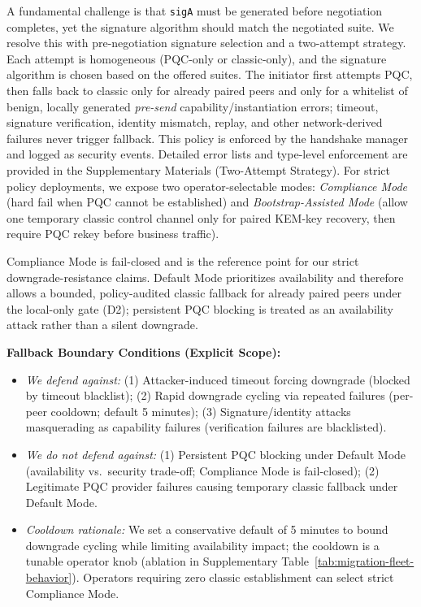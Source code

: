 \documentclass[10pt,journal,compsoc]{IEEEtran}
\providecommand{\tightlist}{%
  \setlength{\itemsep}{0pt}\setlength{\parskip}{0pt}}
\begin{document}
A fundamental challenge is that \texttt{sigA} must be generated before
negotiation completes, yet the signature algorithm should match the
negotiated suite. We resolve this with pre-negotiation signature
selection and a two-attempt strategy. Each attempt is homogeneous
(PQC-only or classic-only), and the signature algorithm is chosen based
on the offered suites. The initiator first attempts PQC, then falls back
to classic only for already paired peers and only for a whitelist of
benign, locally generated \emph{pre-send} capability/instantiation
errors; timeout, signature
verification, identity mismatch, replay, and other network-derived
failures never trigger fallback. This policy is enforced by the
handshake manager and logged as security events. Detailed error lists
and type-level enforcement are provided in the Supplementary Materials
(Two-Attempt Strategy).
For strict policy deployments, we expose two operator-selectable modes:
\emph{Compliance Mode} (hard fail when PQC cannot be established) and
\emph{Bootstrap-Assisted Mode} (allow one temporary classic control
channel only for paired KEM-key recovery, then require PQC rekey before
business traffic).

Compliance Mode is fail-closed and is the reference point for our strict
downgrade-resistance claims. Default Mode prioritizes availability and
therefore allows a bounded, policy-audited classic fallback for already
paired peers under the local-only gate (D2); persistent PQC blocking is
treated as an availability attack rather than a silent downgrade.

\textbf{Fallback Boundary Conditions (Explicit Scope):}
\begin{itemize}\tightlist
\item \emph{We defend against:} (1) Attacker-induced timeout forcing downgrade (blocked by timeout blacklist); (2) Rapid downgrade cycling via repeated failures (per-peer cooldown; default 5 minutes); (3) Signature/identity attacks masquerading as capability failures (verification failures are blacklisted).
\item \emph{We do not defend against:} (1) Persistent PQC blocking under Default Mode (availability vs.\ security trade-off; Compliance Mode is fail-closed); (2) Legitimate PQC provider failures causing temporary classic fallback under Default Mode.
\item \emph{Cooldown rationale:} We set a conservative default of 5 minutes to bound downgrade cycling while limiting availability impact; the cooldown is a tunable operator knob (ablation in Supplementary Table~\ref{tab:migration-fleet-behavior}). Operators requiring zero classic establishment can select strict Compliance Mode.
\end{itemize}
\end{document}
